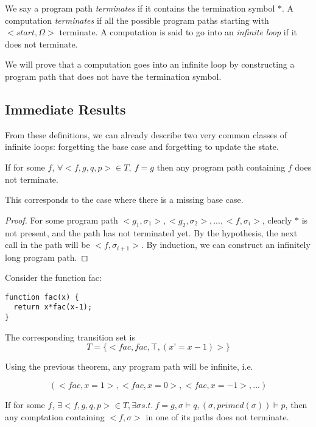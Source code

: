 We say a program path {\it terminates} if it contains the termination symbol $*$.
A computation {\it terminates} if all the possible program paths starting with $<start,\Omega>$ terminate.
A computation is said to go into an {\it infinite loop} if it does not terminate.

We will prove that a computation goes into an infinite loop by constructing a program path that does not have the termination symbol.

\subsection{Immediate Results}
From these definitions, we can already describe two very common classes of infinite loops: forgetting the base case and forgetting to update the state.


\begin{theorem}
  If for some $f$, $\forall <f,g,q,p> \in T,\ f = g$ then any program path containing $f$ does not terminate.
\end{theorem}

This corresponds to the case where there is a missing base case.

\begin{proof}
  For some program path $<g_1,\sigma_1>, <g_2,\sigma_2>,..., <f,\sigma_i>$, clearly $*$ is not present, and the path has not terminated yet.
  By the hypothesis, the next call in the path will be $<f,\sigma_{i+1}>$. By induction, we can construct an infinitely long program path.
\end{proof}

\begin{example}
  Consider the function fac:
\begin{lstlisting}
function fac(x) {
  return x*fac(x-1);
}
\end{lstlisting}

The corresponding transition set is
\[
  T = \{ < fac, fac, \top, (x’=x-1) > \}
\]

Using the previous theorem, any program path will be infinite, i.e.

\[(<fac, x=1>, <fac, x=0>, <fac, x=-1>, ...)\]

\end{example}



\begin{theorem}
  If for some $f$, $\exists <f,g,q,p> \in T,\exists \sigma s.t.\ f=g, \sigma\models q, (\sigma,primed(\sigma))\models p$, then any comptation containing $<f,\sigma>$ in one of its paths does not terminate.
\end{theorem}

